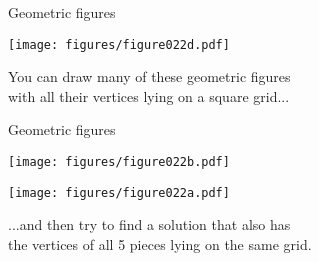 \documentclass[14pt]{beamer}
\begin{document}


    \begin{frame}{Geometric figures}
        \begin{center}
            \texttt{[image: figures/figure022d.pdf]}

            \bigskip

            You can draw many of these geometric figures\\with all their vertices lying on a square grid...

            \bigskip
        \end{center}
    \end{frame}


    \begin{frame}{Geometric figures}
        \begin{center}
            \begin{minipage}{0.5\textwidth}
                \centering \texttt{[image: figures/figure022b.pdf]}
            \end{minipage}\hfill\begin{minipage}{0.49\textwidth}
                \centering \texttt{[image: figures/figure022a.pdf]}
            \end{minipage}
            
            \bigskip \bigskip

            ...and then try to find a solution that also has\\the vertices of all 5 pieces lying on the same grid.
        \end{center}
    \end{frame}
\end{document}

